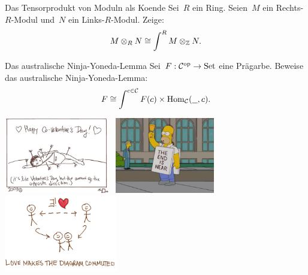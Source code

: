 \documentclass{uebblatt}
\begin{document}
\begin{aufgabe}{Das Tensorprodukt von Moduln als Koende}
Sei~$R$ ein Ring. Seien~$M$ ein Rechts-$R$-Modul
und~$N$ ein Links-$R$-Modul. Zeige:
\[ M \otimes_R N \cong \int^R M \otimes_{\mathbb{Z}} N. \]
\vspace{-1.5em}
\end{aufgabe}

\begin{aufgabe}{Das australische Ninja-Yoneda-Lemma}
Sei~$F : \mathcal{C}^{\mathrm{op}} \to \mathrm{Set}$ eine Prägarbe. Beweise das australische
Ninja-Yoneda-Lemma:
\[ F \cong \int^{c \in \mathcal{C}} F(c) \times \mathrm{Hom}_{\mathcal{C}}(\underline{\ \ }, c). \]
%
\end{aufgabe}

\vspace{-1em}
\centering
\href{https://topologicalmusings.wordpress.com/2009/02/14/happy-co-valentines-day/}{\includegraphics[height=3.3cm]{images/happy-co-valentine}}
\
\includegraphics[height=3.3cm]{images/homer-the-end}
\
\href{http://brownsharpie.courtneygibbons.org/?p=1253}{\includegraphics[height=3.3cm]{images/love-commute}}
\par
\end{document}
